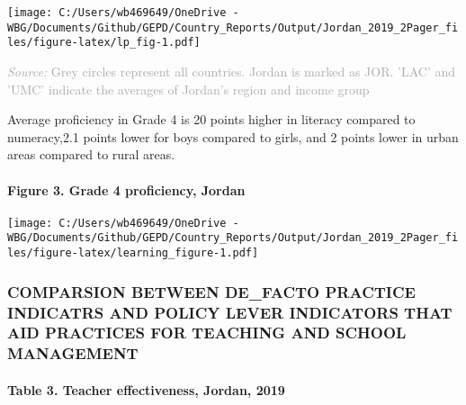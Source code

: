 \documentclass[twocolumn]{article}
\let\oldparagraph\paragraph
\renewcommand{\paragraph}[1]{\oldparagraph{#1}\mbox{}}
\begin{document}
\texttt{[image: C:/Users/wb469649/OneDrive - WBG/Documents/Github/GEPD/Country\_Reports/Output/Jordan\_2019\_2Pager\_files/figure-latex/lp\_fig-1.pdf]}

{\scriptsize
    \textcolor{darkgray}{\textit{Source:} Grey circles represent all countries. Jordan is marked as JOR. 'LAC' and 'UMC' indicate the averages of Jordan's region and income group}
  }

Average proficiency in Grade 4 is 20 points higher in literacy compared
to numeracy,2.1 points lower for boys compared to girls, and 2 points
lower in urban areas compared to rural areas.\\
\vfill\null

\hypertarget{figure-3.-grade-4-proficiency-jordan}{%
\paragraph{Figure 3. Grade 4 proficiency,
Jordan}\label{figure-3.-grade-4-proficiency-jordan}}

\texttt{[image: C:/Users/wb469649/OneDrive - WBG/Documents/Github/GEPD/Country\_Reports/Output/Jordan\_2019\_2Pager\_files/figure-latex/learning\_figure-1.pdf]}

\hypertarget{comparsion-between-de_facto-practice-indicatrs-and-policy-lever-indicators-that-aid-practices-for-teaching-and-school-management}{%
\subsubsection{\texorpdfstring{\textbf{COMPARSION BETWEEN DE\_FACTO
PRACTICE INDICATRS AND POLICY LEVER INDICATORS THAT AID PRACTICES FOR
TEACHING AND SCHOOL
MANAGEMENT}}{COMPARSION BETWEEN DE\_FACTO PRACTICE INDICATRS AND POLICY LEVER INDICATORS THAT AID PRACTICES FOR TEACHING AND SCHOOL MANAGEMENT}}\label{comparsion-between-de_facto-practice-indicatrs-and-policy-lever-indicators-that-aid-practices-for-teaching-and-school-management}}

\hypertarget{table-3.-teacher-effectiveness-jordan-2019}{%
\paragraph{Table 3. Teacher effectiveness, Jordan,
2019}\label{table-3.-teacher-effectiveness-jordan-2019}}
\end{document}
